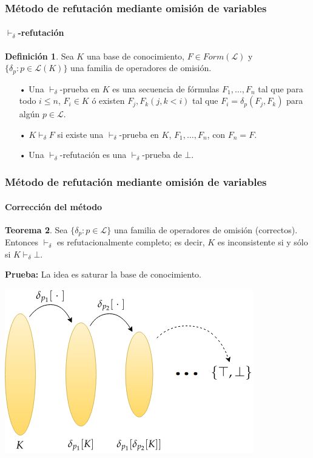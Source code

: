 \documentclass[12pt,a4paper]{beamer}
\theoremstyle{definition}
\newtheorem{thm}{Teorema}
\newtheorem{defn}[thm]{Definición}
\theoremstyle{remark}
\begin{document}
\begin{frame}
\frametitle{\normalsize{Método de refutación mediante omisión de variables}}
\framesubtitle{$\vdash_{\delta}$-refutación}
\begin{defn}
Sea $K$ una base de conocimiento, $F\in Form(\mathcal{L})$ y $\{ \delta_p : p \in \mathcal{L}(K) \}$ una familia de operadores de omisión.
\begin{itemize}
\item[•]Una  $\vdash_{\delta}$-prueba en $K$ es una secuencia de fórmulas $F_1, \dots ,F_n$ tal que para todo $i \leq n$, $F_i \in K$ ó existen $F_j , F_k (j,k < i)$ tal que $F_i = \delta_p (F_j , F_k)$ para algún $p \in \mathcal{L}$.
\item[•] $K \vdash_{\delta} F$ si existe una $\vdash_{\delta}$-prueba en $K$, $F_1, \dots ,F_n$, con $F_n = F$.
\item[•] Una $\vdash_{\delta}$-refutación es una $\vdash_{\delta}$-prueba de $\bot$.
\end{itemize}
\end{defn}
\end{frame}

\begin{frame}
\frametitle{\normalsize{Método de refutación mediante omisión de variables}}
\framesubtitle{Corrección del método}
\begin{thm}
Sea $\{ \delta_p : p \in \mathcal{L} \}$ una familia de operadores de omisión (correctos). Entonces $\vdash_{\delta}$ es refutacionalmente completo; es decir, $K$ es inconsistente si y sólo si $K \vdash_{\delta} \bot$.
\end{thm}
\noindent \textbf{Prueba:} La idea es saturar la base de conocimiento.
\begin{center}
\includegraphics[scale=0.35]{imagenes/comple.png}
\end{center}
\end{frame}
\end{document}

